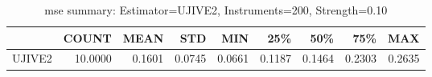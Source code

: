 \begin{table}[ht]
\centering
\caption{mse summary: Estimator=UJIVE2, Instruments=200, Strength=0.10}
\begin{tabular}{lrrrrrrrr}
\toprule
 & COUNT & MEAN & STD & MIN & 25\% & 50\% & 75\% & MAX \\
\midrule
UJIVE2 & 10.0000 & 0.1601 & 0.0745 & 0.0661 & 0.1187 & 0.1464 & 0.2303 & 0.2635 \\
\bottomrule
\end{tabular}
\end{table}

